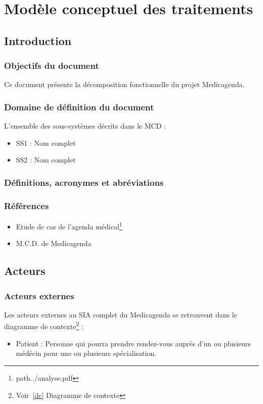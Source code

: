 \documentclass[a4paper, 11pt]{report}
\begin{document}

\tableofcontents

\chapter{Modèle conceptuel des traitements}

\section{Introduction}

\subsection{Objectifs du document}
Ce document présente la décomposition fonctionnelle du projet Medicagenda.
\subsection{Domaine de définition du document}
L'ensemble des sous-systèmes décrits dans le MCD :
\begin{itemize}
	\item SS1 : Nom complet
	\item SS2 : Nom complet 
\end{itemize}
\subsection{Définitions, acronymes et abréviations}
\subsection{Références}
\begin{itemize}
	\item[] Etude de cas de l'agenda médical\footnote{path{../analyse.pdf}}
	\item[] M.C.D. de Medicagenda
\end{itemize}
\newpage
\section{Acteurs}
\subsection{Acteurs externes}
Les acteurs externes au SIA complet du Medicagenda se retrouvent dans le 
diagramme de contexte\footnote{Voir~\ref{dc} Diagramme de contexte} : 
\begin{itemize}
	\item Patient : Personne qui pourra prendre rendez-vous auprès d'un ou
		plusieurs médécin pour une ou plusieurs spécialisation.
\end{itemize}
\end{document}
